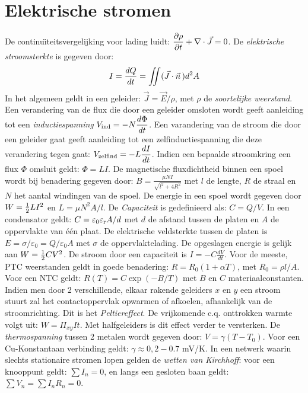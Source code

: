 \section{Elektrische stromen}
De continu\"{\i}teitsvergelijking voor lading luidt:
$\displaystyle\frac{\partial \rho}{\partial t}+\nabla\cdot\vec{J}=0$.
De {\it elektrische stroomsterkte} is gegeven door:
\[
I=\frac{dQ}{dt}=\int\hspace{-1.5ex}\int(\vec{J}\cdot\vec{n}\,)d^2A
\]
In het algemeen geldt in een geleider: $\vec{J}=\vec{E}/\rho$, met $\rho$ de
{\it soortelijke weerstand}.
\npar
Een verandering van de flux die door een geleider omsloten wordt geeft
aanleiding tot een {\it inductiespanning}
$\displaystyle V_{\rm ind}=-N\frac{d\Phi}{dt}$. Een varandering van de stroom
die door een geleider gaat geeft aanleiding tot een zelfinductiespanning die
deze verandering tegen gaat: $\displaystyle V_{\rm zelfind}=-L\frac{dI}{dt}$.
Indien een bepaalde stroomkring een flux $\Phi$ omsluit geldt: $\Phi=LI$.
\npar
De magnetische fluxdichtheid binnen een spoel wordt bij benadering gegeven
door: $\displaystyle B=\frac{\mu NI}{\sqrt{l^2+4R^2}}$ met $l$ de lengte, $R$ de
straal en $N$ het aantal windingen van de spoel. De energie in een spoel wordt
gegeven door $W=\mbox{$\frac{1}{2}$} LI^2$ en $L=\mu N^2A/l$.
\npar
De {\it Capaciteit} is gedefinieerd als: $C=Q/V$. In een condensator geldt:
$C=\varepsilon_0\varepsilon_{\rm r}A/d$ met $d$ de afstand tussen de platen en $A$ de oppervlakte
van \'e\'en plaat. De elektrische veldsterkte tussen de platen is
$E=\sigma/\varepsilon_0=Q/\varepsilon_0A$ met $\sigma$ de oppervlaktelading. De opgeslagen
energie is gelijk aan $W=\mbox{$\frac{1}{2}$} CV^2$. De stroom door een capaciteit is
$\displaystyle I=-C\frac{dV}{dt}$.
\npar
Voor de meeste, PTC weerstanden geldt in goede benadering: $R=R_0(1+\alpha T)$,
met $R_0=\rho l/A$. Voor een NTC geldt: $R(T)=C\exp(-B/T)$ met $B$ en $C$
materiaalconstanten.
\npar
Indien men door 2 verschillende, elkaar rakende geleiders $x$ en $y$ een
stroom stuurt zal het contactoppervlak opwarmen of afkoelen, afhankelijk van
de stroomrichting. Dit is het {\it Peltiereffect}. De vrijkomende c.q.
onttrokken warmte volgt uit: $W=\Pi_{xy}It$. Met halfgeleiders is dit effect
verder te versterken.
\npar
De {\it thermospanning} tussen 2 metalen wordt gegeven door: $V=\gamma(T-T_0)$.
Voor een Cu-Konstantaan verbinding geldt: $\gamma\approx0,2-0.7$ mV/K.
\npar
In een netwerk waarin slechts stationaire stromen lopen gelden de {\it wetten
van Kirchhoff}: voor een knooppunt geldt: $\sum I_n=0$, en langs een gesloten
baan geldt: $\sum V_n=\sum I_nR_n=0$.

